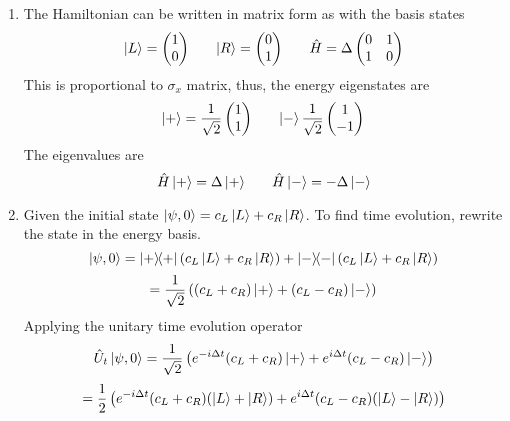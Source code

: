 \begin{sol}
\begin{enumerate}[label=\textbf{(\alph*)}]
\item
The Hamiltonian can be written in matrix form as with the basis states
\begin{equation}
	\ket L=\begin{pmatrix}1\\0
\end{pmatrix}\:\:\:\:\:\:\:\:\ket R=\begin{pmatrix}
0\\1\end{pmatrix}\:\:\:\:\:\:\:\:\hat H=\Delta\begin{pmatrix}
0&1\\1&0
\end{pmatrix}
\end{equation}
This is proportional to $\sigma_x$ matrix, thus, the energy eigenstates are
\begin{equation}
	\ket+=\frac{1}{\sqrt{2}}\begin{pmatrix}
1\\1
\end{pmatrix}\:\:\:\:\:\:\:\:\ket-\frac{1}{\sqrt{2}}\begin{pmatrix}
1\\-1
\end{pmatrix}
\end{equation} 
The eigenvalues are 
\begin{equation}
	\hat H\ket+=\Delta\ket+\:\:\:\:\:\:\:\:\hat H\ket-=-\Delta\ket-
\end{equation} 
\item
Given the initial state $\ket{\psi,0}=c_L\ket L+c_R\ket R$. To find time evolution, rewrite the state in the energy basis.
\begin{equation}
	\ket{\psi,0}=\ketbra{+}{+}(c_L\ket L+c_R\ket R)+\ketbra{-}{-}(c_L\ket L+c_R\ket R)
\end{equation} 
\begin{equation}
	=\frac{1}{\sqrt{2}}\left((c_L+c_R)\ket++(c_L-c_R)\ket-\right)
\end{equation} 
Applying the unitary time evolution operator
\begin{equation}
	\hat U_t\ket{\psi,0}=\frac{1}{\sqrt{2}}\left(e^{-i\Delta t}(c_L+c_R)\ket++e^{i\Delta t}(c_L-c_R)\ket-\right)
\end{equation}
\begin{equation}
	=\frac{1}{2}\left(e^{-i\Delta t}(c_L+c_R)(\ket L+\ket R)+e^{i\Delta t}(c_L-c_R)(\ket L-\ket R)\right)

\end{equation}
\end{enumerate}
\end{sol}

